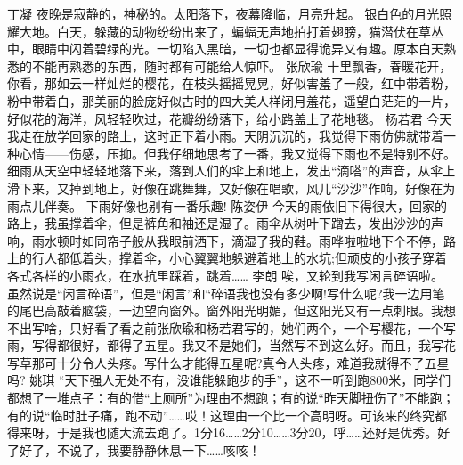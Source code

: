 {}\markdownRendererInterblockSeparator
{}丁凝\markdownRendererInterblockSeparator
{}夜晚是寂静的，神秘的。太阳落下，夜幕降临，月亮升起。\markdownRendererInterblockSeparator
{}银白色的月光照耀大地。白天，躲藏的动物纷纷出来了，蝙蝠无声地拍打着翅膀，猫潜伏在草丛中，眼睛中闪着碧绿的光。一切陷入黑暗，一切也都显得诡异又有趣。原本白天熟悉的不能再熟悉的东西，随时都有可能给人惊吓。\markdownRendererInterblockSeparator
{}\markdownRendererInterblockSeparator
{}张欣瑜\markdownRendererInterblockSeparator
{}十里飘香，春暖花开，你看，那如云一样灿烂的樱花，在枝头摇摇晃晃，好似害羞了一般，红中带着粉，粉中带着白，那美丽的脸庞好似古时的四大美人样闭月羞花，遥望白茫茫的一片，好似花的海洋，风轻轻吹过，花瓣纷纷落下，给小路盖上了花地毯。\markdownRendererInterblockSeparator
{}\markdownRendererInterblockSeparator
{}杨若君\markdownRendererInterblockSeparator
{}今天我走在放学回家的路上，这时正下着小雨。天阴沉沉的，我觉得下雨仿佛就带着一种心情——伤感，压抑。但我仔细地思考了一番，我又觉得下雨也不是特别不好。细雨从天空中轻轻地落下来，落到人们的伞上和地上，发出“滴嗒”的声音，从伞上滑下来，又掉到地上，好像在跳舞舞，又好像在唱歌，风儿“沙沙”作响，好像在为雨点儿伴奏。\markdownRendererInterblockSeparator
{}下雨好像也别有一番乐趣! \markdownRendererInterblockSeparator
{}\markdownRendererInterblockSeparator
{}陈姿伊\markdownRendererInterblockSeparator
{}今天的雨依旧下得很大，回家的路上，我虽撑着伞，但是裤角和袖还是湿了。雨伞从树叶下蹭去，发出沙沙的声响，雨水顿时如同帘子般从我眼前洒下，滴湿了我的鞋。雨哗啦啦地下个不停，路上的行人都低着头，撑着伞，小心翼翼地躲避着地上的水坑;但顽皮的小孩子穿着各式各样的小雨衣，在水抗里踩着，跳着……\markdownRendererInterblockSeparator
{}\markdownRendererInterblockSeparator
{}李朗\markdownRendererInterblockSeparator
{}唉，又轮到我写闲言碎语啦。虽然说是“闲言碎语”，但是“闲言”和“碎语我也没有多少啊!写什么呢?我一边用笔的尾巴高敲着脑袋，一边望向窗外。窗外阳光明媚，但这阳光又有一点刺眼。我想不出写啥，只好看了看之前张欣瑜和杨若君写的，她们两个，一个写樱花，一个写雨，写得都很好，都得了五星。我又不是她们，当然写不到这么好。而且，我写花写草那可十分令人头疼。写什么才能得五星呢?真令人头疼，难道我就得不了五星吗?\markdownRendererInterblockSeparator
{}\markdownRendererInterblockSeparator
{}姚琪\markdownRendererInterblockSeparator
{}“天下强人无处不有，没谁能躲跑步的手”，这不一听到跑800米，同学们都想了一堆点子：有的借“上厕所”为理由不想跑；有的说“昨天脚扭伤了”不能跑；有的说“临时肚子痛，跑不动”……哎！这理由一个比一个高明呀。可该来的终究都得来呀，于是我也随大流去跑了。1分16……2分10……3分20，呼……还好是优秀。好了好了，不说了，我要静静休息一下……咳咳！\markdownRendererInterblockSeparator
